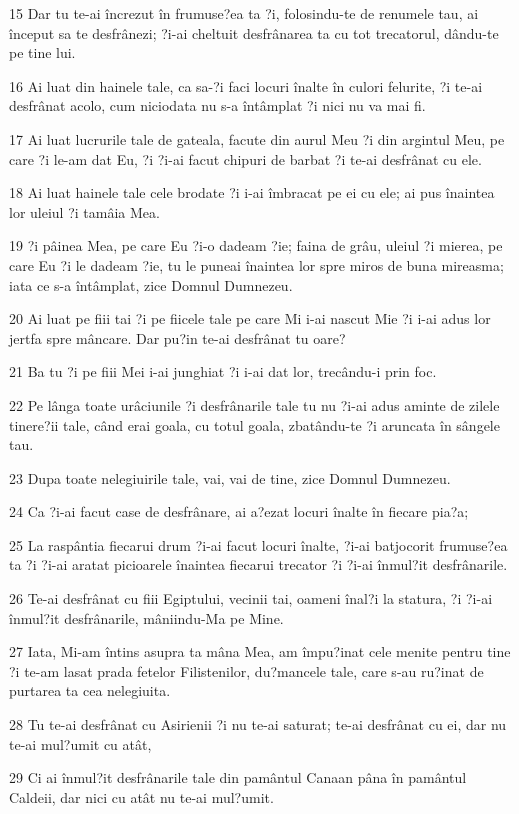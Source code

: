 \par 15 Dar tu te-ai încrezut în frumuse?ea ta ?i, folosindu-te de renumele tau, ai început sa te desfrânezi; ?i-ai cheltuit desfrânarea ta cu tot trecatorul, dându-te pe tine lui.
\par 16 Ai luat din hainele tale, ca sa-?i faci locuri înalte în culori felurite, ?i te-ai desfrânat acolo, cum niciodata nu s-a întâmplat ?i nici nu va mai fi.
\par 17 Ai luat lucrurile tale de gateala, facute din aurul Meu ?i din argintul Meu, pe care ?i le-am dat Eu, ?i ?i-ai facut chipuri de barbat ?i te-ai desfrânat cu ele.
\par 18 Ai luat hainele tale cele brodate ?i i-ai îmbracat pe ei cu ele; ai pus înaintea lor uleiul ?i tamâia Mea.
\par 19 ?i pâinea Mea, pe care Eu ?i-o dadeam ?ie; faina de grâu, uleiul ?i mierea, pe care Eu ?i le dadeam ?ie, tu le puneai înaintea lor spre miros de buna mireasma; iata ce s-a întâmplat, zice Domnul Dumnezeu.
\par 20 Ai luat pe fiii tai ?i pe fiicele tale pe care Mi i-ai nascut Mie ?i i-ai adus lor jertfa spre mâncare. Dar pu?in te-ai desfrânat tu oare?
\par 21 Ba tu ?i pe fiii Mei i-ai junghiat ?i i-ai dat lor, trecându-i prin foc.
\par 22 Pe lânga toate urâciunile ?i desfrânarile tale tu nu ?i-ai adus aminte de zilele tinere?ii tale, când erai goala, cu totul goala, zbatându-te ?i aruncata în sângele tau.
\par 23 Dupa toate nelegiuirile tale, vai, vai de tine, zice Domnul Dumnezeu.
\par 24 Ca ?i-ai facut case de desfrânare, ai a?ezat locuri înalte în fiecare pia?a;
\par 25 La raspântia fiecarui drum ?i-ai facut locuri înalte, ?i-ai batjocorit frumuse?ea ta ?i ?i-ai aratat picioarele înaintea fiecarui trecator ?i ?i-ai înmul?it desfrânarile.
\par 26 Te-ai desfrânat cu fiii Egiptului, vecinii tai, oameni înal?i la statura, ?i ?i-ai înmul?it desfrânarile, mâniindu-Ma pe Mine.
\par 27 Iata, Mi-am întins asupra ta mâna Mea, am împu?inat cele menite pentru tine ?i te-am lasat prada fetelor Filistenilor, du?mancele tale, care s-au ru?inat de purtarea ta cea nelegiuita.
\par 28 Tu te-ai desfrânat cu Asirienii ?i nu te-ai saturat; te-ai desfrânat cu ei, dar nu te-ai mul?umit cu atât,
\par 29 Ci ai înmul?it desfrânarile tale din pamântul Canaan pâna în pamântul Caldeii, dar nici cu atât nu te-ai mul?umit.
